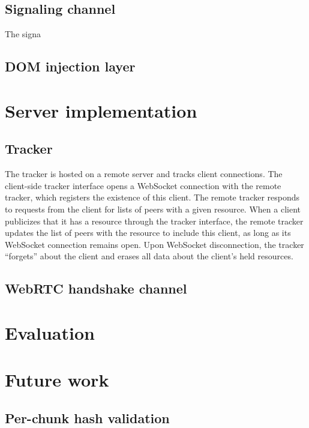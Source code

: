 \documentclass[letterpaper,twocolumn,10pt]{article}
\begin{document}
\subsection{Signaling channel}

The signa

\subsection{DOM injection layer}


\section{Server implementation}

\subsection{Tracker}
The tracker is hosted on a remote server and tracks client connections. 
The client-side tracker interface  opens a WebSocket connection with the remote tracker, 
which registers the existence of this client. The remote tracker responds to
requests from the client for lists of peers with a given resource. When a client
publicizes that it has a resource through the tracker interface, the remote tracker updates
the list of peers with the resource to include this client, as
long as its WebSocket connection remains open. Upon WebSocket disconnection,
the tracker ``forgets'' about the client and erases all data about the client's
held resources.

\subsection{WebRTC handshake channel}



\section{Evaluation}


\section{Future work}

\subsection{Per-chunk hash validation}
\end{document}
